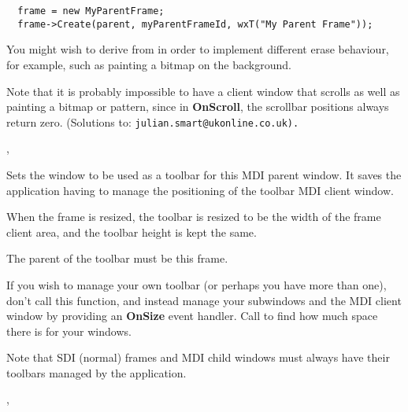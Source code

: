 \begin{verbatim}
  frame = new MyParentFrame;
  frame->Create(parent, myParentFrameId, wxT("My Parent Frame"));
\end{verbatim}


You might wish to derive from  in order
to implement different erase behaviour, for example, such as painting a bitmap
on the background.

Note that it is probably impossible to have a client window that scrolls as well as painting
a bitmap or pattern, since in {\bf OnScroll}, the scrollbar positions always return zero.
(Solutions to: \tt{julian.smart@ukonline.co.uk}).


,\rtfsp
{}

\label{wxmdiparentframesettoolbar}


Sets the window to be used as a toolbar for this
MDI parent window. It saves the application having to manage the positioning
of the toolbar MDI client window.




When the frame is resized, the toolbar is resized to be the width of
the frame client area, and the toolbar height is kept the same.

The parent of the toolbar must be this frame.

If you wish to manage your own toolbar (or perhaps you have more than one),
don't call this function, and instead manage your subwindows and the MDI client window by
providing an {\bf OnSize} event handler. Call  to
find how much space there is for your windows.

Note that SDI (normal) frames and MDI child windows must always have their
toolbars managed by the application.


,\rtfsp
{}

